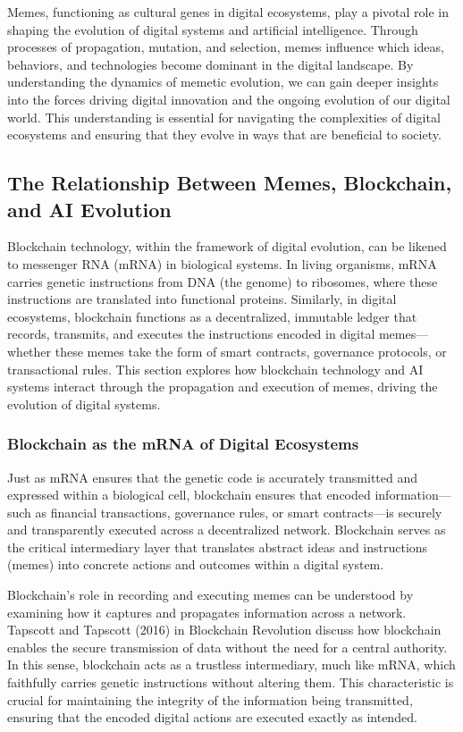 \documentclass[12pt,twoside]{article}
\begin{document}
Memes, functioning as cultural genes in digital ecosystems, play a pivotal role in shaping the evolution of digital systems and artificial intelligence. Through processes of propagation, mutation, and selection, memes influence which ideas, behaviors, and technologies become dominant in the digital landscape. By understanding the dynamics of memetic evolution, we can gain deeper insights into the forces driving digital innovation and the ongoing evolution of our digital world. This understanding is essential for navigating the complexities of digital ecosystems and ensuring that they evolve in ways that are beneficial to society.

\subsection{The Relationship Between Memes, Blockchain, and AI Evolution}

Blockchain technology, within the framework of digital evolution, can be likened to messenger RNA (mRNA) in biological systems. In living organisms, mRNA carries genetic instructions from DNA (the genome) to ribosomes, where these instructions are translated into functional proteins. Similarly, in digital ecosystems, blockchain functions as a decentralized, immutable ledger that records, transmits, and executes the instructions encoded in digital memes—whether these memes take the form of smart contracts, governance protocols, or transactional rules. This section explores how blockchain technology and AI systems interact through the propagation and execution of memes, driving the evolution of digital systems.

\subsubsection{Blockchain as the mRNA of Digital Ecosystems}

Just as mRNA ensures that the genetic code is accurately transmitted and expressed within a biological cell, blockchain ensures that encoded information—such as financial transactions, governance rules, or smart contracts—is securely and transparently executed across a decentralized network. Blockchain serves as the critical intermediary layer that translates abstract ideas and instructions (memes) into concrete actions and outcomes within a digital system.

Blockchain’s role in recording and executing memes can be understood by examining how it captures and propagates information across a network. Tapscott and Tapscott (2016) in Blockchain Revolution discuss how blockchain enables the secure transmission of data without the need for a central authority. In this sense, blockchain acts as a trustless intermediary, much like mRNA, which faithfully carries genetic instructions without altering them. This characteristic is crucial for maintaining the integrity of the information being transmitted, ensuring that the encoded digital actions are executed exactly as intended.
\end{document}

